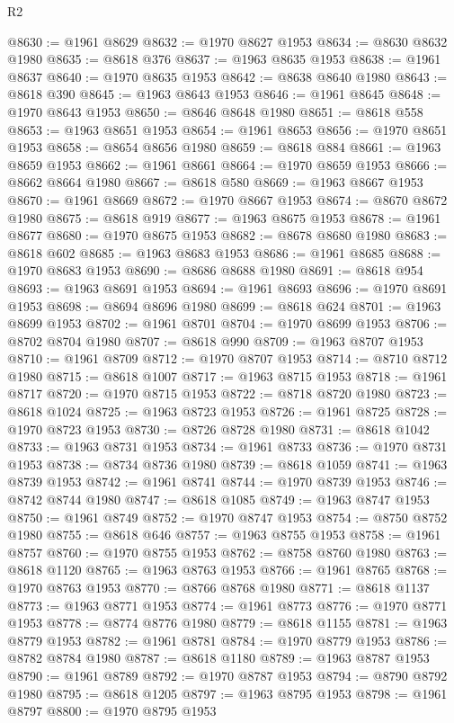 \begin{lexlean}{R2}
\begin{coremodule}
@8630 := @1961 @8629
@8632 := @1970 @8627 @1953
@8634 := @8630 @8632 @1980
@8635 := @8618 @376
@8637 := @1963 @8635 @1953
@8638 := @1961 @8637
@8640 := @1970 @8635 @1953
@8642 := @8638 @8640 @1980
@8643 := @8618 @390
@8645 := @1963 @8643 @1953
@8646 := @1961 @8645
@8648 := @1970 @8643 @1953
@8650 := @8646 @8648 @1980
@8651 := @8618 @558
@8653 := @1963 @8651 @1953
@8654 := @1961 @8653
@8656 := @1970 @8651 @1953
@8658 := @8654 @8656 @1980
@8659 := @8618 @884
@8661 := @1963 @8659 @1953
@8662 := @1961 @8661
@8664 := @1970 @8659 @1953
@8666 := @8662 @8664 @1980
@8667 := @8618 @580
@8669 := @1963 @8667 @1953
@8670 := @1961 @8669
@8672 := @1970 @8667 @1953
@8674 := @8670 @8672 @1980
@8675 := @8618 @919
@8677 := @1963 @8675 @1953
@8678 := @1961 @8677
@8680 := @1970 @8675 @1953
@8682 := @8678 @8680 @1980
@8683 := @8618 @602
@8685 := @1963 @8683 @1953
@8686 := @1961 @8685
@8688 := @1970 @8683 @1953
@8690 := @8686 @8688 @1980
@8691 := @8618 @954
@8693 := @1963 @8691 @1953
@8694 := @1961 @8693
@8696 := @1970 @8691 @1953
@8698 := @8694 @8696 @1980
@8699 := @8618 @624
@8701 := @1963 @8699 @1953
@8702 := @1961 @8701
@8704 := @1970 @8699 @1953
@8706 := @8702 @8704 @1980
@8707 := @8618 @990
@8709 := @1963 @8707 @1953
@8710 := @1961 @8709
@8712 := @1970 @8707 @1953
@8714 := @8710 @8712 @1980
@8715 := @8618 @1007
@8717 := @1963 @8715 @1953
@8718 := @1961 @8717
@8720 := @1970 @8715 @1953
@8722 := @8718 @8720 @1980
@8723 := @8618 @1024
@8725 := @1963 @8723 @1953
@8726 := @1961 @8725
@8728 := @1970 @8723 @1953
@8730 := @8726 @8728 @1980
@8731 := @8618 @1042
@8733 := @1963 @8731 @1953
@8734 := @1961 @8733
@8736 := @1970 @8731 @1953
@8738 := @8734 @8736 @1980
@8739 := @8618 @1059
@8741 := @1963 @8739 @1953
@8742 := @1961 @8741
@8744 := @1970 @8739 @1953
@8746 := @8742 @8744 @1980
@8747 := @8618 @1085
@8749 := @1963 @8747 @1953
@8750 := @1961 @8749
@8752 := @1970 @8747 @1953
@8754 := @8750 @8752 @1980
@8755 := @8618 @646
@8757 := @1963 @8755 @1953
@8758 := @1961 @8757
@8760 := @1970 @8755 @1953
@8762 := @8758 @8760 @1980
@8763 := @8618 @1120
@8765 := @1963 @8763 @1953
@8766 := @1961 @8765
@8768 := @1970 @8763 @1953
@8770 := @8766 @8768 @1980
@8771 := @8618 @1137
@8773 := @1963 @8771 @1953
@8774 := @1961 @8773
@8776 := @1970 @8771 @1953
@8778 := @8774 @8776 @1980
@8779 := @8618 @1155
@8781 := @1963 @8779 @1953
@8782 := @1961 @8781
@8784 := @1970 @8779 @1953
@8786 := @8782 @8784 @1980
@8787 := @8618 @1180
@8789 := @1963 @8787 @1953
@8790 := @1961 @8789
@8792 := @1970 @8787 @1953
@8794 := @8790 @8792 @1980
@8795 := @8618 @1205
@8797 := @1963 @8795 @1953
@8798 := @1961 @8797
@8800 := @1970 @8795 @1953

\end{coremodule}
\end{lexlean}
